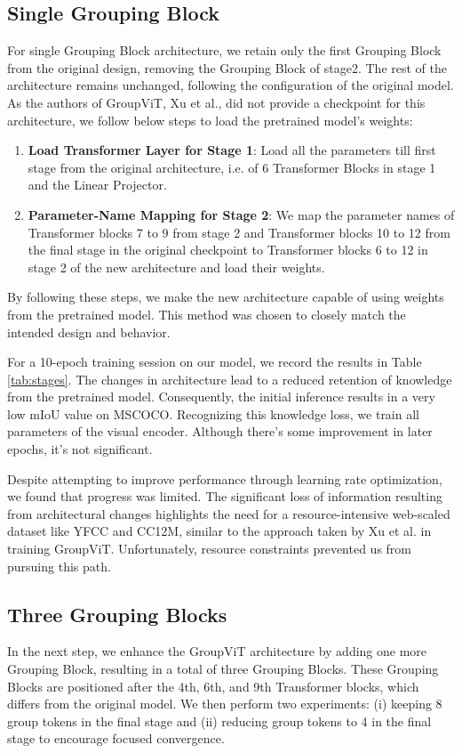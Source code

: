 \subsection{Single Grouping Block}
\label{sec:stage1}
For single Grouping Block architecture, we retain only the first Grouping Block from the original design, removing the Grouping Block of stage2. The rest of the architecture remains unchanged, following the configuration of the original model. As the authors of GroupViT, Xu et al.,  did not provide a checkpoint for this architecture, we follow below steps to load the pretrained model's weights:

\begin{enumerate}
  \item \textbf{Load Transformer Layer for Stage 1}: Load all the parameters till first stage from the original architecture, i.e. of 6 Transformer Blocks in stage 1 and the Linear Projector.
  \item \textbf{Parameter-Name Mapping for Stage 2}:  We map the parameter names of Transformer blocks 7 to 9 from stage 2 and Transformer blocks 10 to 12 from the final stage in the original checkpoint to Transformer blocks 6 to 12 in stage 2 of the new architecture and load their weights.
\end{enumerate}
By following these steps, we make the new architecture capable of using weights from the pretrained model. This method was chosen to closely match the intended design and behavior.

For a 10-epoch training session on our model, we record the results in Table \ref{tab:stages}. The changes in architecture lead to a reduced retention of knowledge from the pretrained model. Consequently, the initial inference results in a very low mIoU value on MSCOCO. Recognizing this knowledge loss, we train all parameters of the visual encoder. Although there's some improvement in later epochs, it's not significant.

Despite attempting to improve performance through learning rate optimization, we found that progress was limited. The significant loss of information resulting from architectural changes highlights the need for a resource-intensive web-scaled dataset like YFCC and CC12M, similar to the approach taken by Xu et al. in training GroupViT. Unfortunately, resource constraints prevented us from pursuing this path.


\subsection{Three Grouping Blocks}
In the next step, we enhance the GroupViT architecture by adding one more Grouping Block, resulting in a total of three Grouping Blocks. These Grouping Blocks are positioned after the 4th, 6th, and 9th Transformer blocks, which differs from the original model. We then perform two experiments: (i) keeping 8 group tokens in the final stage and (ii) reducing group tokens to 4 in the final stage to encourage focused convergence.

